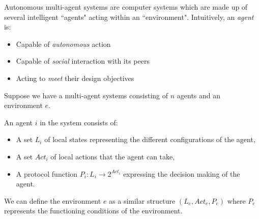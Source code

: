 \documentclass[11pt]{article}
\newenvironment{definition}[1][Definition]{\begin{trivlist}
\item[\hskip \labelsep {\bfseries #1}]}{\end{trivlist}}
\begin{document}
Autonomous multi-agent systems are computer systems which are made up of several intelligent ``agents" acting within an ``environment". 
Intuitively, an \textit{agent} is: 
\begin{itemize}
\item Capable of \textit{autonomous} action 
\item Capable of \textit{social} interaction with its peers
\item Acting to \textit{meet} their design objectives 
\end{itemize}
 
Suppose we have a multi-agent systems consisting of $n$ agents and an environment $e$.
\begin{definition} 
An agent $i$ in the system consists of: 
\begin{itemize}
\item A set $L_i$ of local states representing the different configurations of the agent,
\item A set $Act_i$ of local actions that the agent can take,
\item A protocol function $P_i : L_i \rightarrow 2^{Act_i} $ expressing the decision making of the agent.
\end{itemize} 
\end{definition}

We can define the environment $e$ as a similar structure $(L_e, Act_e, P_e)$ where $P_e$ represents the functioning conditions of the environment. 
\end{document}

